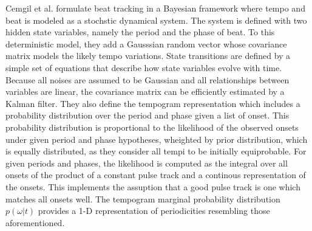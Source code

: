 \documentclass{scrartcl}
\begin{document}


Cemgil et al. \cite{Cemgil2001} formulate beat tracking in a Bayesian framework where tempo and beat is modeled as a stochstic dynamical system. The system is defined with two hidden state variables, namely the period and the phase of beat. To this deterministic model, they add a Gausssian random vector whose covariance matrix models the likely tempo variations. State transitions are defined by a simple set of equations that describe how state variables evolve with time. 
Because all noises are assumed to be Gaussian and all relationships between variables are linear, the covariance matrix can be efficiently estimated by a Kalman filter. They also define the tempogram representation which includes a probability distribution over the period and phase given a list of onset. This probability distribution is proportional to the likelihood of the observed onsets under given period and phase hypotheses, wheighted by prior distribution, which is equally distributed, as they consider all tempi to be initially equiprobable. For given periods and phases, the likelihood is computed as the integral over all onsets of the product of a constant pulse track and a continous representation of the onsets. This implements the assuption that a good pulse track is one which matches all onsets well. The tempogram marginal probability distribution $p(\omega | t)$ provides a 1-D representation of periodicities resembling those aforementioned. 
\end{document}
